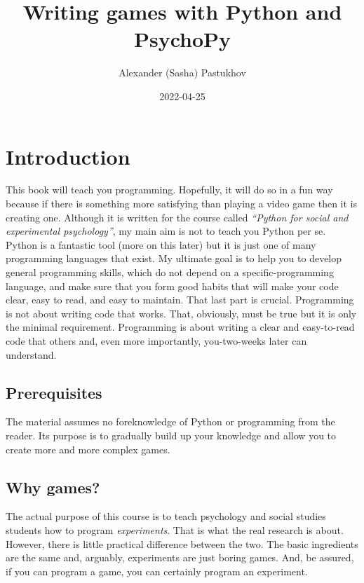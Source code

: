 \documentclass[
]{book}
\title{Writing games with Python and PsychoPy}
\author{Alexander (Sasha) Pastukhov}
\date{2022-04-25}
\begin{document}
\maketitle

{
\setcounter{tocdepth}{1}
\tableofcontents
}
\hypertarget{intro}{%
\chapter{Introduction}\label{intro}}

This book will teach you programming. Hopefully, it will do so in a fun way because if there is something more satisfying than playing a video game then it is creating one. Although it is written for the course called \emph{``Python for social and experimental psychology''}, my main aim is not to teach you Python per se. Python is a fantastic tool (more on this later) but it is just one of many programming languages that exist. My ultimate goal is to help you to develop general programming skills, which do not depend on a specific-programming language, and make sure that you form good habits that will make your code clear, easy to read, and easy to maintain. That last part is crucial. Programming is not about writing code that works. That, obviously, must be true but it is only the minimal requirement. Programming is about writing a clear and easy-to-read code that others and, even more importantly, you-two-weeks later can understand.

\hypertarget{prerequisites}{%
\section{Prerequisites}\label{prerequisites}}

The material assumes no foreknowledge of Python or programming from the reader. Its purpose is to gradually build up your knowledge and allow you to create more and more complex games.

\hypertarget{why-games}{%
\section{Why games?}\label{why-games}}

The actual purpose of this course is to teach psychology and social studies students how to program \emph{experiments}. That is what the real research is about. However, there is little practical difference between the two. The basic ingredients are the same and, arguably, experiments are just boring games. And, be assured, if you can program a game, you can certainly program an experiment.
\end{document}
